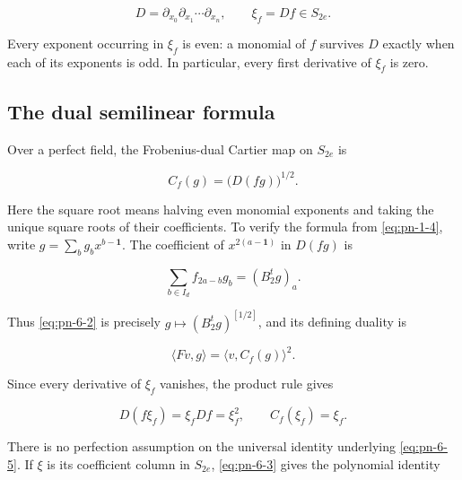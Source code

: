 \documentclass[11pt]{article}
\begin{document}
\begin{equation}
 D=\partial_{x_0}\partial_{x_1}\cdots\partial_{x_n},\qquad
                         \xi_f=Df\in S_{2e}.                           \label{eq:pn-6-1}
\end{equation}

Every exponent occurring in \(\xi_f\) is even: a monomial of \(f\)
survives \(D\) exactly when each of its exponents is odd. In particular,
every first derivative of \(\xi_f\) is zero.

\subsection{The dual semilinear formula}

Over a perfect field, the Frobenius-dual Cartier map on \(S_{2e}\) is

\begin{equation}
                         C_f(g)=\bigl(D(fg)\bigr)^{1/2}.               \label{eq:pn-6-2}
\end{equation}

Here the square root means halving even monomial exponents and taking
the unique square roots of their coefficients. To verify the formula
from \eqref{eq:pn-1-4}, write \(g=\sum_b g_bx^{b-\mathbf1}\). The coefficient of
\(x^{2(a-\mathbf1)}\) in \(D(fg)\) is

\begin{equation}
                  \sum_{b\in I_d}f_{2a-b}g_b=(B_2^tg)_a.              \label{eq:pn-6-3}
\end{equation}

Thus \eqref{eq:pn-6-2} is precisely \(g\mapsto(B_2^tg)^{[1/2]}\), and its defining
duality is

\begin{equation}
                     \langle Fv,g\rangle=\langle v,C_f(g)\rangle^2.    \label{eq:pn-6-4}
\end{equation}

Since every derivative of \(\xi_f\) vanishes, the product rule gives

\begin{equation}
                 D(f\xi_f)=\xi_fDf=\xi_f^2,
 \qquad                         C_f(\xi_f)=\xi_f.                     \label{eq:pn-6-5}
\end{equation}

There is no perfection assumption on the universal identity underlying
\eqref{eq:pn-6-5}. If \(\xi\) is its coefficient column in \(S_{2e}\), \eqref{eq:pn-6-3} gives
the polynomial identity
\end{document}
